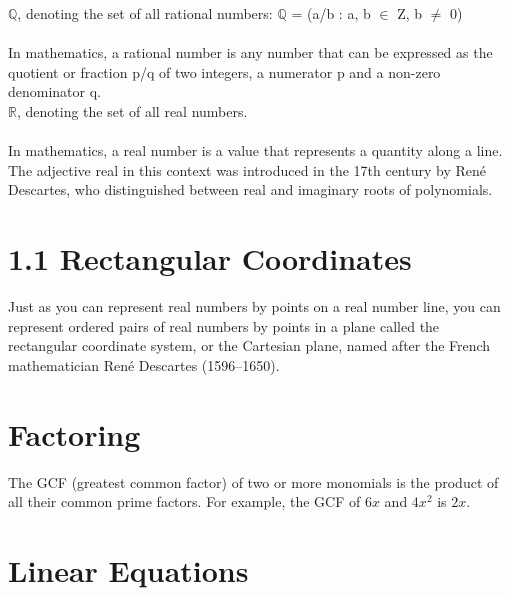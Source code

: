 \documentclass[12pt, letterpaper]{article}
\begin{document}
\noindent$\mathbb{Q}$, denoting the set of all rational numbers: $\mathbb{Q}$ =
(a/b : a, b $\in$ Z, b $\neq$ 0)
\\\\
In mathematics, a rational number is any number that can be expressed as the quotient or fraction p/q of two integers, a numerator p and a non-zero denominator q.
\\

\noindent$\mathbb{R}$, denoting the set of all real numbers.
\\\\
In mathematics, a real number is a value that represents a quantity along a line. The adjective real in this context was introduced in the 17th century by René Descartes, who distinguished between real and imaginary roots of polynomials.
\\

\section{1.1 Rectangular Coordinates}

Just as you can represent real numbers by points on a real number line, you can
represent ordered pairs of real numbers by points in a plane called the
rectangular coordinate system, or the Cartesian plane, named after the French
mathematician René Descartes (1596–1650).
\\

\section{Factoring}

The GCF (greatest common factor) of two or more monomials is the product of all their
common prime factors. For example, the GCF of $6x$ and $4x^2$ is $2x$.

\section{Linear Equations}
\end{document}

